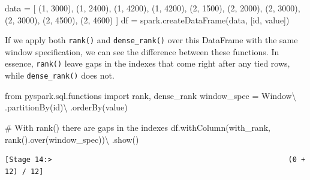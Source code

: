 \documentclass[
  11pt,
  letterpaper,
  DIV=11,
  numbers=noendperiod]{scrreprt}
\newenvironment{Shaded}{\begin{snugshade}}{\end{snugshade}}
\newcommand{\CommentTok}[1]{\textcolor[rgb]{0.37,0.37,0.37}{#1}}
\newcommand{\DecValTok}[1]{\textcolor[rgb]{0.68,0.00,0.00}{#1}}
\newcommand{\ImportTok}[1]{\textcolor[rgb]{0.00,0.46,0.62}{#1}}
\newcommand{\NormalTok}[1]{\textcolor[rgb]{0.00,0.23,0.31}{#1}}
\newcommand{\OperatorTok}[1]{\textcolor[rgb]{0.37,0.37,0.37}{#1}}
\newcommand{\StringTok}[1]{\textcolor[rgb]{0.13,0.47,0.30}{#1}}
\begin{document}
\begin{Shaded}
\begin{Highlighting}[]
\NormalTok{data }\OperatorTok{=}\NormalTok{ [}
\NormalTok{    (}\DecValTok{1}\NormalTok{, }\DecValTok{3000}\NormalTok{), (}\DecValTok{1}\NormalTok{, }\DecValTok{2400}\NormalTok{),}
\NormalTok{    (}\DecValTok{1}\NormalTok{, }\DecValTok{4200}\NormalTok{), (}\DecValTok{1}\NormalTok{, }\DecValTok{4200}\NormalTok{),}
\NormalTok{    (}\DecValTok{2}\NormalTok{, }\DecValTok{1500}\NormalTok{), (}\DecValTok{2}\NormalTok{, }\DecValTok{2000}\NormalTok{),}
\NormalTok{    (}\DecValTok{2}\NormalTok{, }\DecValTok{3000}\NormalTok{), (}\DecValTok{2}\NormalTok{, }\DecValTok{3000}\NormalTok{),}
\NormalTok{    (}\DecValTok{2}\NormalTok{, }\DecValTok{4500}\NormalTok{), (}\DecValTok{2}\NormalTok{, }\DecValTok{4600}\NormalTok{)}
\NormalTok{]}
\NormalTok{df }\OperatorTok{=}\NormalTok{ spark.createDataFrame(data, [}\StringTok{\textquotesingle{}id\textquotesingle{}}\NormalTok{, }\StringTok{\textquotesingle{}value\textquotesingle{}}\NormalTok{])}
\end{Highlighting}
\end{Shaded}

If we apply both \texttt{rank()} and \texttt{dense\_rank()} over this
DataFrame with the same window specification, we can see the difference
between these functions. In essence, \texttt{rank()} leave gaps in the
indexes that come right after any tied rows, while
\texttt{dense\_rank()} does not.

\begin{Shaded}
\begin{Highlighting}[]
\ImportTok{from}\NormalTok{ pyspark.sql.functions }\ImportTok{import}\NormalTok{ rank, dense\_rank}
\NormalTok{window\_spec }\OperatorTok{=}\NormalTok{ Window}\OperatorTok{\textbackslash{}}
\NormalTok{    .partitionBy(}\StringTok{\textquotesingle{}id\textquotesingle{}}\NormalTok{)}\OperatorTok{\textbackslash{}}
\NormalTok{    .orderBy(}\StringTok{\textquotesingle{}value\textquotesingle{}}\NormalTok{)}

\CommentTok{\# With rank() there are gaps in the indexes}
\NormalTok{df.withColumn(}\StringTok{\textquotesingle{}with\_rank\textquotesingle{}}\NormalTok{, rank().over(window\_spec))}\OperatorTok{\textbackslash{}}
\NormalTok{    .show()}
\end{Highlighting}
\end{Shaded}

\begin{verbatim}
[Stage 14:>                                                       (0 + 12) / 12]
\end{verbatim}
\end{document}
